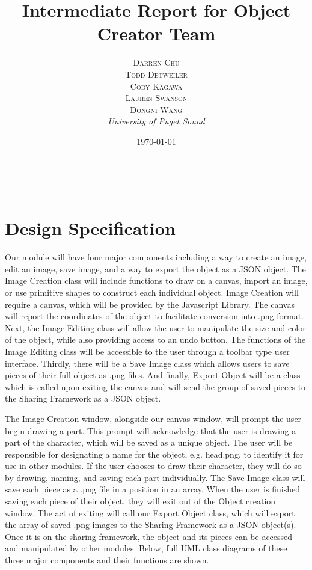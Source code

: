 \documentclass[a4paper, 11pt]{article} %
\title{\textbf{Intermediate Report for Object Creator Team}}
\author{\textsc{Darren Chu\\Todd Detweiler\\Cody Kagawa\\Lauren Swanson\\Dongni Wang} %
\\{\textit{University of Puget Sound}}} %
\date{\today} %
\makeatletter
\renewcommand{\maketitle}{ %
\begin{flushright} %
{\LARGE\@title} %

\vspace{50pt} %

{\large\@author} %
\\\@date %

\vspace{40pt} %
\end{flushright}
}
\makeatother
\begin{document}
\maketitle %


\section*{Design Specification}

Our module will have four major components including a way to create an image, edit an image, save image, and a way to export the object as a JSON object. The Image Creation class will include functions to draw on a canvas, import an image, or use primitive shapes to construct each individual object. Image Creation will require a canvas, which will be provided by the Javascript Library. The canvas will report the coordinates of the object to facilitate conversion into .png format. Next, the Image Editing class will allow the user to manipulate the size and color of the object, while also providing access to an undo button. The functions of the Image Editing class will be accessible to the user through a toolbar type user interface. Thirdly, there will be a Save Image class which allows users to save pieces of their full object as .png files. And finally, Export Object will be a class which is called upon exiting the canvas and will send the group of saved pieces to the Sharing Framework as a JSON object.

The Image Creation window, alongside our canvas window, will prompt the user begin drawing a part. This prompt will acknowledge that the user is drawing a part of the character, which will be saved as a unique object. The user will be responsible for designating a name for the object, e.g. head.png, to identify it for use in other modules. If the user chooses to draw their character, they will do so by drawing, naming, and saving each part individually. The Save Image class will save each piece as a .png file in a position in an array. When the user is finished saving each piece of their object, they will exit out of the Object creation window. The act of exiting will call our Export Object class, which will export the array of saved .png images to the Sharing Framework as a JSON object(s). Once it is on the sharing framework, the object and its pieces can be accessed and manipulated by other modules. Below, full UML class diagrams of these three major components and their functions are shown.
\end{document}
